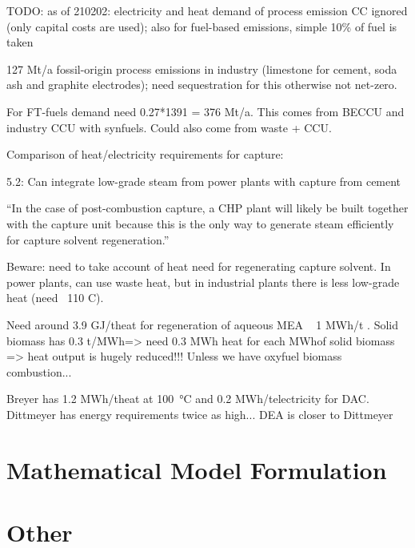 TODO: as of 210202: electricity and heat demand of process emission CC ignored
(only capital costs are used); also for fuel-based emissions, simple 10\% of
fuel is taken

127 Mt\co/a fossil-origin process emissions in industry (limestone for cement,
soda ash and graphite electrodes); need sequestration for this otherwise not
net-zero.

For FT-fuels demand need 0.27*1391 = 376 Mt\co/a. This comes from BECCU and
industry CCU with synfuels. Could also come from waste + CCU.


Comparison of heat/electricity requirements for capture:

 5.2: Can integrate low-grade steam from power plants with
\co capture from cement

``In the case of post-combustion \co capture, a CHP plant will likely be built
together with the \co capture unit because this is the only way to generate
steam efficiently for \co capture solvent regeneration.''

Beware: need to take account of heat need for regenerating \co capture solvent.
In power plants, can use waste heat, but in industrial plants there is less
low-grade heat (need ~110 C). 

Need around 3.9 GJ/t\co heat for regeneration of aqueous MEA ~ 1 MWh/t\co
{}. Solid biomass has 0.3 t\co/MWh\th => need 0.3 MWh heat for
each MWh\th of solid biomass => heat output is hugely reduced!!! Unless we have
oxyfuel biomass combustion...

Breyer 
has 1.2 MWh/t\co heat at \SI{100}{\celsius} and 0.2 MWh\el/t\co electricity for DAC.
Dittmeyer has energy requirements twice as high... DEA is closer to Dittmeyer



\section{Mathematical Model Formulation}

\section{Other}

